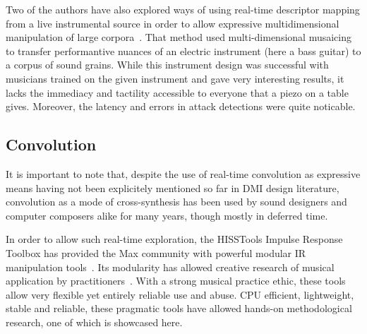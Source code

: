 \label{sandbox}
Two of the authors have also explored ways of using real-time descriptor mapping from a live instrumental source in order to allow expressive multidimensional manipulation of large corpora~\cite{TremblaySchwarz-nime2010-surfing-the-waves}. That method used multi-dimensional musaicing to transfer performantive nuances of an electric instrument (here a bass guitar) to a corpus of sound grains. While this instrument design was successful with musicians trained on the given instrument and gave very interesting results, it lacks the immediacy and tactility accessible to everyone that a piezo on a table gives. Moreover, the latency and errors in attack detections were quite noticable.


\subsection{Convolution}

It is important to note that, despite the use of real-time convolution as expressive means having not been explicitely mentioned so far in DMI design literature, convolution as a mode of cross-synthesis has been used by sound designers and computer composers alike for many years, though mostly in deferred time.

In order to allow such real-time exploration, the HISSTools Impulse Response Toolbox has provided the Max community with powerful modular IR manipulation tools~\cite{HarkerTremblay-icmc2012-hisstools}. Its modularity has allowed creative research of musical application by practitioners~\cite{HarkerTremblay-forum2013-rethinking-the-box}. With a strong musical practice ethic, these tools allow very flexible yet entirely reliable use and abuse. CPU efficient, lightweight, stable and reliable, these pragmatic tools have allowed hands-on methodological research, one of which is showcased here.


